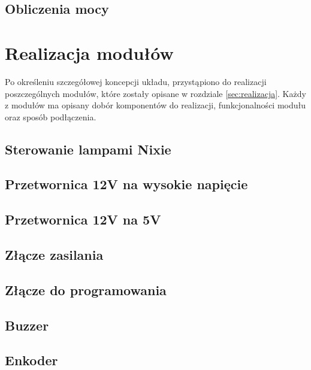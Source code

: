\documentclass[twoside]{article}
\numberwithin{equation}{section}
\begin{document}
\subsection{Obliczenia mocy}
\label{sec:obliczenia_mocy}

\newpage

\section{Realizacja modułów}
Po określeniu szczegółowej koncepcji układu, przystąpiono do realizacji poszczególnych modułów, które zostały opisane w rozdziale \ref{sec:realizacja}.
Każdy z modułów ma opisany dobór komponentów do realizacji, funkcjonalności modułu oraz sposób podłączenia.

\subsection{Sterowanie lampami Nixie}

\newpage

\subsection{Przetwornica 12V na wysokie napięcie}

\newpage

\subsection{Przetwornica 12V na 5V}

\newpage

\subsection{Złącze zasilania}

\newpage

\subsection{Złącze do programowania}
\label{sec:usb_c_to_program}

\newpage

\subsection{Buzzer}

\newpage

\subsection{Enkoder}

\newpage
\end{document}

